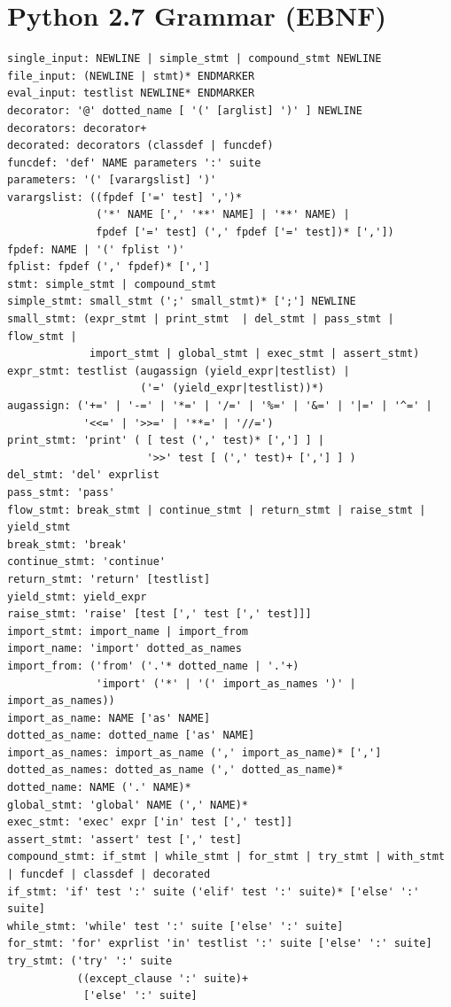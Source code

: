 \documentclass{icldt}
\numberwithin{equation}{section}       %
\begin{document}
{{\chapter{Python 2.7 Grammar (EBNF)}
\label{appendix:py-grammar}
\begin{lstlisting}[breaklines]
single_input: NEWLINE | simple_stmt | compound_stmt NEWLINE
file_input: (NEWLINE | stmt)* ENDMARKER
eval_input: testlist NEWLINE* ENDMARKER
decorator: '@' dotted_name [ '(' [arglist] ')' ] NEWLINE
decorators: decorator+
decorated: decorators (classdef | funcdef)
funcdef: 'def' NAME parameters ':' suite
parameters: '(' [varargslist] ')'
varargslist: ((fpdef ['=' test] ',')*
              ('*' NAME [',' '**' NAME] | '**' NAME) |
              fpdef ['=' test] (',' fpdef ['=' test])* [','])
fpdef: NAME | '(' fplist ')'
fplist: fpdef (',' fpdef)* [',']
stmt: simple_stmt | compound_stmt
simple_stmt: small_stmt (';' small_stmt)* [';'] NEWLINE
small_stmt: (expr_stmt | print_stmt  | del_stmt | pass_stmt | flow_stmt |
             import_stmt | global_stmt | exec_stmt | assert_stmt)
expr_stmt: testlist (augassign (yield_expr|testlist) |
                     ('=' (yield_expr|testlist))*)
augassign: ('+=' | '-=' | '*=' | '/=' | '%=' | '&=' | '|=' | '^=' |
            '<<=' | '>>=' | '**=' | '//=')
print_stmt: 'print' ( [ test (',' test)* [','] ] |
                      '>>' test [ (',' test)+ [','] ] )
del_stmt: 'del' exprlist
pass_stmt: 'pass'
flow_stmt: break_stmt | continue_stmt | return_stmt | raise_stmt | yield_stmt
break_stmt: 'break'
continue_stmt: 'continue'
return_stmt: 'return' [testlist]
yield_stmt: yield_expr
raise_stmt: 'raise' [test [',' test [',' test]]]
import_stmt: import_name | import_from
import_name: 'import' dotted_as_names
import_from: ('from' ('.'* dotted_name | '.'+)
              'import' ('*' | '(' import_as_names ')' | import_as_names))
import_as_name: NAME ['as' NAME]
dotted_as_name: dotted_name ['as' NAME]
import_as_names: import_as_name (',' import_as_name)* [',']
dotted_as_names: dotted_as_name (',' dotted_as_name)*
dotted_name: NAME ('.' NAME)*
global_stmt: 'global' NAME (',' NAME)*
exec_stmt: 'exec' expr ['in' test [',' test]]
assert_stmt: 'assert' test [',' test]
compound_stmt: if_stmt | while_stmt | for_stmt | try_stmt | with_stmt | funcdef | classdef | decorated
if_stmt: 'if' test ':' suite ('elif' test ':' suite)* ['else' ':' suite]
while_stmt: 'while' test ':' suite ['else' ':' suite]
for_stmt: 'for' exprlist 'in' testlist ':' suite ['else' ':' suite]
try_stmt: ('try' ':' suite
           ((except_clause ':' suite)+
            ['else' ':' suite]

\end{lstlisting}}}
\end{document}
